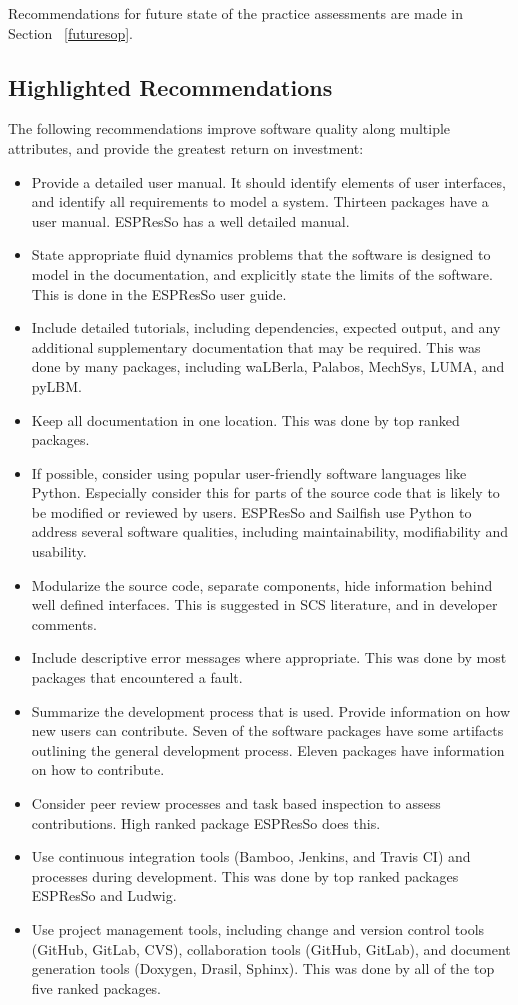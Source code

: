 \documentclass[final, 3p, times, authoryear]{elsarticle}
\begin{document}
Recommendations for future state of the practice assessments are made in Section
~\ref{futuresop}.

\subsection{Highlighted Recommendations} \label{highlightedrecommendations}

The following recommendations improve software quality along multiple
attributes, and provide the greatest return on investment:

\begin{itemize}
	\item Provide a detailed user manual. It should identify elements of user
	interfaces, and identify all requirements to model a system. Thirteen
	packages have a user manual. ESPResSo has a well detailed manual.
	\item State appropriate fluid dynamics problems that the software is
	designed to model in the documentation, and explicitly state the limits of
	the software. This is done in the ESPResSo user guide.
	\item Include detailed tutorials, including dependencies, expected output,
	and any additional supplementary documentation that may be required. This
	was done by many packages, including waLBerla, Palabos, MechSys, LUMA, and
	pyLBM.
	\item Keep all documentation in one location. This was done by top ranked packages.
	\item If possible, consider using popular user-friendly software languages
	like Python. Especially consider this for parts of the source code that is
	likely to be modified or reviewed by users. ESPResSo and Sailfish use Python
	to address several software qualities, including maintainability,
	modifiability and usability.
	\item Modularize the source code, separate components, hide information
	behind well defined interfaces. This is suggested in SCS literature, and in
	developer comments.
	\item Include descriptive error messages where appropriate. This was done by
	most packages that encountered a fault.
	\item Summarize the development process that is used. Provide information on
	how new users can contribute. Seven of the software packages have some
	artifacts outlining the general development process. Eleven packages have
	information on how to contribute.
	\item Consider peer review processes and task based inspection to assess
	contributions. High ranked package ESPResSo does this.
	\item Use continuous integration tools (Bamboo, Jenkins, and Travis CI) and
	processes during development. This was done by top ranked packages ESPResSo
	and Ludwig.
	\item Use project management tools, including change and version control
	tools (GitHub, GitLab, CVS), collaboration tools (GitHub, GitLab), and
	document generation tools (Doxygen, Drasil, Sphinx). This was done by all of
	the top five ranked packages.
\end{itemize}
\end{document}
